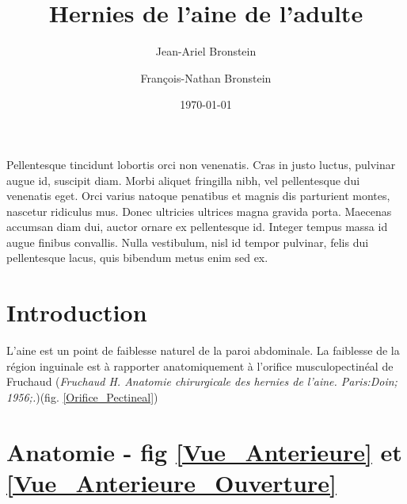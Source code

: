 \documentclass[frenc,10pt,a4paper]{article}
\renewenvironment{abstract}
  {{\bfseries\noindent{\abstractname}\par\nobreak}\footnotesize}
  {\bigskip}
\begin{document}
\title{Hernies de l'aine de l'adulte}


\author[1]{Jean-Ariel Bronstein}%
\author[2]{François-Nathan Bronstein}%
%
%


\vspace{-1em}



\date{\today}


\begingroup
\let\center\flushleft
\let\endcenter\endflushleft
\maketitle
\endgroup


\pagebreak


\begin{abstract}
Pellentesque tincidunt lobortis orci non venenatis. Cras in justo
luctus, pulvinar augue id, suscipit diam. Morbi aliquet fringilla nibh,
vel pellentesque dui venenatis eget. Orci varius natoque penatibus et
magnis dis parturient montes, nascetur ridiculus mus. Donec ultricies
ultrices magna gravida porta. Maecenas accumsan diam dui, auctor ornare
ex pellentesque id. Integer tempus massa id augue finibus convallis.
Nulla vestibulum, nisl id tempor pulvinar, felis dui pellentesque lacus,
quis bibendum metus enim sed ex.%
\end{abstract}%

\pagebreak

\tableofcontents
\listoffigures
\listoftables

\pagebreak

\section{Introduction}
{\label{313749}}

L'aine est un point de faiblesse naturel de la paroi abdominale. La faiblesse de la région inguinale est à rapporter anatomiquement à l'orifice musculopectinéal de Fruchaud (\textit{Fruchaud H. Anatomie chirurgicale des hernies de l’aine. Paris:Doin; 1956;.})(fig. \ref{Orifice_Pectineal})

\section{Anatomie - fig \ref{Vue_Anterieure} et \ref{Vue_Anterieure_Ouverture}}
\end{document}
